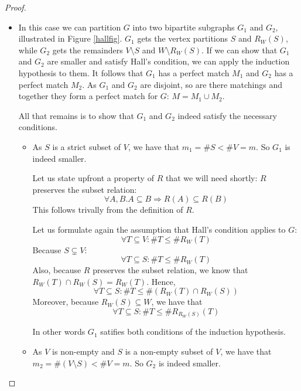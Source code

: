 \begin{proof}
\begin{itemize}
\begin{itemize}
\begin{itemize}
\item[\dashuline{$\exists S: \emptyset \neq S \subsetneq V \wedge \#S =\#R(S)$:}]
In this case we can partition $G$ into two bipartite subgraphs $G_1$ and $G_2$,
illustrated in Figure \ref{hallfig}. $G_1$ gets the vertex partitions $S$ and $R_W(S)$, 
while $G_2$ gets the remainders $V \setminus S$ and $W \setminus R_W(S)$.
If we can show that $G_1$ and $G_2$ are smaller and satisfy Hall's condition,
we can apply the induction hypothesis to them. It follows that $G_1$
has a perfect match $M_1$ and $G_2$ has a perfect match $M_2$. As $G_1$ 
and $G_2$ are disjoint, so are there matchings and together they
form a perfect match for $G$: $M = M_1 \cup M_2$.

All that remains is to show that $G_1$ and $G_2$ indeed satisfy the necessary
conditions.
\begin{itemize}
\item[\dotuline{$G_1$:}]
As $S$ is a strict subset of $V$, we have that $m_1 = \#S < \#V = m$.
So $G_1$ is indeed smaller.

Let us state upfront a property of $R$ that we will need shortly:
$R$ preserves the subset relation:
\[ \forall A, B. A \subseteq B \Rightarrow R(A) \subseteq R(B) \]
This follows trivally from the definition of $R$.

Let us formulate again the assumption that Hall's condition applies to $G$:
\[ \forall T \subseteq V: \#T \leq \#R_W(T) \]
Because $S \subsetneq V$:
\[ \forall T \subseteq S: \#T \leq \#R_W(T) \]
Also, because $R$ preserves the subset relation, 
we know that $R_W(T) \cap R_W(S) = R_W(T)$. Hence,
\[ \forall T \subseteq S: \#T \leq \#(R_W(T) \cap R_W(S)) \]
Moreover, because $R_W(S) \subseteq W$, we have that
\[ \forall T \subseteq S: \#T \leq \#R_{R_W(S)}(T) \]

In other words $G_1$ satifies both conditions of
the induction hypothesis.

\item[\dotuline{$G_2$:}]
As $V$ is non-empty and $S$ is a non-empty subset of $V$, we have that $m_2 =
\#(V \setminus S) < \#V = m$. So $G_2$ is indeed smaller.


\end{itemize}
\end{itemize}
\end{itemize}
\end{itemize}
\end{proof}
